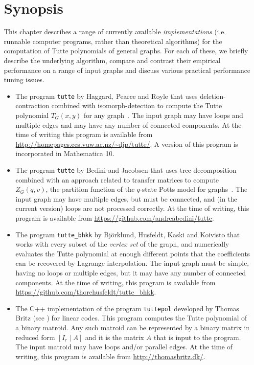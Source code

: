 
\section{Synopsis} This chapter describes a range of currently available {\em implementations} (i.e. runnable computer programs, rather than theoretical algorithms) for the computation of Tutte polynomials of general graphs. For each of these, we briefly describe the underlying algorithm, compare and contrast their empirical performance on a range of input graphs and discuss various practical performance tuning issues. 

\begin{itemize}
\item The program \verb+tutte+ by Haggard, Pearce and Royle that uses deletion-contraction combined with isomorph-detection to compute the Tutte polynomial $T_G(x,y)$ for any graph~\cite{HPR10,PHR09}. The input graph may have loops and multiple edges and may have any number of connected components.  At the time of writing this program is available from \url{http://homepages.ecs.vuw.ac.nz/~djp/tutte/}. A version of this program is incorporated in Mathematica 10.

\item The program \verb+tutte+ by Bedini and Jacobsen that uses tree decomposition combined with an approach related to transfer matrices to compute $Z_G(q,v)$, the partition function of the $q$-state Potts model for graphs~\cite{BJ10}. The input graph may have multiple edges, but must be connected, and (in the current version) loops are not processed correctly. At the time of writing, this program is available from \url{https://github.com/andreabedini/tutte}.

\item The program \verb+tutte_bhkk+ by Bj\"orklund, Husfeldt, Kaski and Koivisto \cite{BHKK08b} that works with every subset of the {\em vertex set} of the graph, and numerically evaluates the Tutte polynomial at enough different points that the coefficients can be recovered by Lagrange interpolation. The input graph must be simple, having no loops or multiple edges, but it may have any number of connected components. At the time of writing, this program is available from
\url{https://github.com/thorehusfeldt/tutte_bhkk}.

 \item The C++ implementation of the program \verb+tuttepol+ developed by Thomas Britz (see \cite{MR2319391}) for linear codes. This program computes the Tutte polynomial of a binary matroid. Any such matroid can be represented by a binary matrix in reduced form $[I_r \mid A]$ and it is the
 matrix $A$ that is input to the program. The input matroid may have loops and/or parallel edges. At the time of writing, this program is available from \url{http://thomasbritz.dk/}.
 

\end{itemize}
